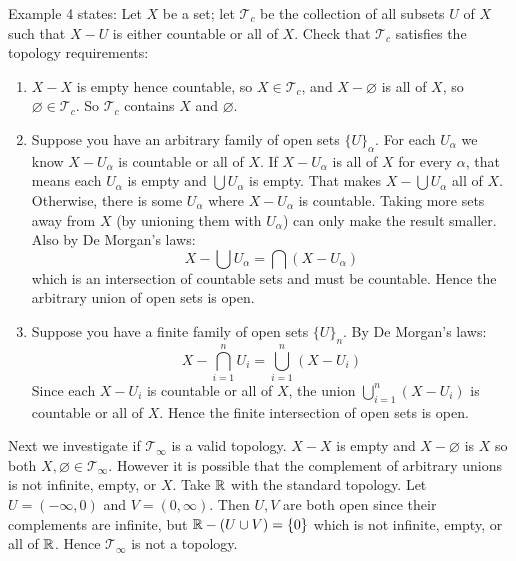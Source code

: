 \documentclass{article}
\begin{document}
Example 4 states: Let $X$ be a set; let $\mathscr{T}_c$ be the collection of all subsets $U$ of $X$ such that $X - U$ is either countable or all of $X$. Check that $\mathscr{T}_c$ satisfies the topology requirements:
\begin{enumerate}
  \item $X - X$ is empty hence countable, so $X \in \mathscr{T}_c$, and $X - \varnothing$ is all of $X$, so $\varnothing \in \mathscr{T}_c$. So $\mathscr{T}_c$ contains $X$ and $\varnothing$.
  \item Suppose you have an arbitrary family of open sets $\{U\}_\alpha$. For each $U_\alpha$ we know $X - U_\alpha$ is countable or all of $X$. If $X - U_\alpha$ is all of $X$ for every $\alpha$, that means each $U_\alpha $ is empty and $\bigcup U_\alpha$ is empty. That makes $X - \bigcup U_\alpha$ all of $X$. Otherwise, there is some $U_\alpha$ where $X - U_\alpha$ is countable. Taking more sets away from $X$ (by unioning them with $U_\alpha$) can only make the result smaller. Also by De Morgan's laws:
        $$ X - \bigcup U_\alpha = \bigcap (X - U_\alpha)$$
        which is an intersection of countable sets and must be countable. Hence the arbitrary union of open sets is open.
  \item Suppose you have a finite family of open sets $\{U\}_n$. By De Morgan's laws:
        $$X - \bigcap_{i=1}^n U_i = \bigcup_{i=1}^n (X - U_i)$$
        Since each $X - U_i$ is countable or all of $X$, the union $\bigcup_{i=1}^n (X - U_i)$ is countable or all of $X$. Hence the finite intersection of open sets is open.
\end{enumerate}

Next we investigate if $\mathscr{T}_\infty$ is a valid topology. $X - X$ is empty and $X - \varnothing$ is $X$ so both $X, \varnothing \in \mathscr{T}_\infty$. However it is possible that the complement of arbitrary unions is not infinite, empty, or $X$. Take $\mathbb{R}$ with the standard topology. Let $U = (-\infty, 0)$ and $V = (0, \infty)$. Then $U, V$ are both open since their complements are infinite, but $\mathbb{R} - (U \cup V) = \{0\}$ which is not infinite, empty, or all of $\mathbb{R}$. Hence $\mathscr{T}_\infty$ is not a topology.
\end{document}
